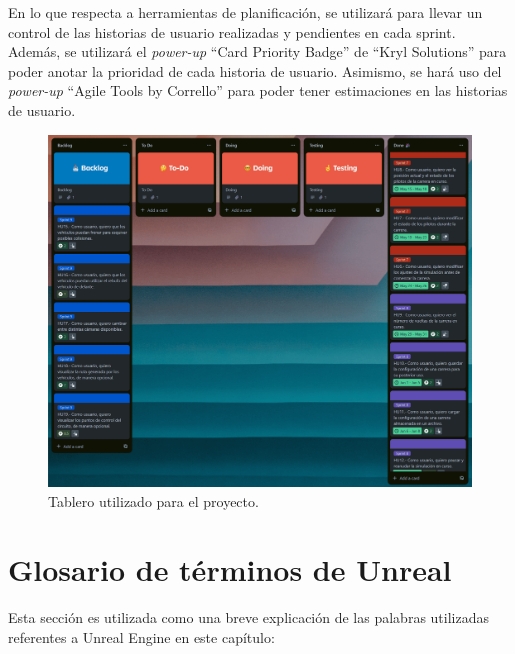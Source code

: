 En lo que respecta a herramientas de planificación, se utilizará \planApp para llevar un control de las historias de usuario realizadas y pendientes en cada sprint. Además, se utilizará el \textit{power-up} ``Card Priority Badge'' de ``Kryl Solutions'' para poder anotar la prioridad de cada historia de usuario. Asimismo, se hará uso del \textit{power-up} ``Agile Tools by Corrello'' para poder tener estimaciones en las historias de usuario.

\begin{figure}[H]
    \centering
    \includegraphics[width=\textwidth]{imagenes/trello-mio-reduced.png}
    \caption{Tablero utilizado para el proyecto.}
\end{figure}

\newpage

\section{Glosario de términos de Unreal}
\label{sec:terminosunreal}
Esta sección es utilizada como una breve explicación de las palabras utilizadas referentes a Unreal Engine en este capítulo:


